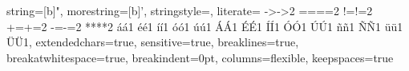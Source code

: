 {  %
  string=[b]{"},%
  morestring=[b]{'},%
  stringstyle={\color{FireBrick}},%
  literate=%
    {->}{{->}}2 {==}{{==}}2 {!=}{{!=}}2%
    {+=}{{+=}}2 {-=}{{-=}}2 {**}{{**}}2%
    {á}{{\'a}}1 {é}{{\'e}}1 {í}{{\'i}}1 {ó}{{\'o}}1 {ú}{{\'u}}1%
    {Á}{{\'A}}1 {É}{{\'E}}1 {Í}{{\'I}}1 {Ó}{{\'O}}1 {Ú}{{\'U}}1%
    {ñ}{{\~n}}1 {Ñ}{{\~N}}1 {ü}{{\"u}}1 {Ü}{{\"U}}1,%
  extendedchars=true,%
  sensitive=true,%
  breaklines=true,%
  breakatwhitespace=true,%
  breakindent=0pt,%
  columns=flexible,%
  keepspaces=true%
}
